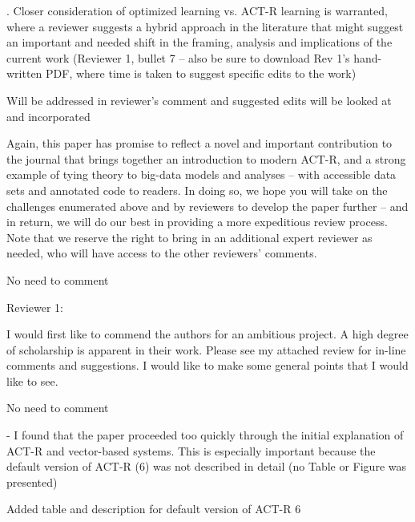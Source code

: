 \documentclass[answers,12pt]{exam}
\begin{document}
\begin{questions}
. Closer consideration of optimized learning vs. ACT-R learning is warranted, where a reviewer suggests a hybrid approach in the literature that might suggest an important and needed shift in the framing, analysis and implications of the current work (Reviewer 1, bullet 7 -- also be sure to download Rev 1's hand-written PDF, where time is taken to suggest specific edits to the work)

\begin{solution}
Will be addressed in reviewer's comment and suggested edits will be looked at and incorporated
\end{solution}

\question Again, this paper has promise to reflect a novel and important contribution to the journal that brings together an introduction to modern ACT-R, and a strong example of tying theory to big-data models and analyses -- with accessible data sets and annotated code to readers. In doing so, we hope you will take on the challenges enumerated above and by reviewers to develop the paper further -- and in return, we will do our best in providing a more expeditious review process. Note that we reserve the right to bring in an additional expert reviewer as needed, who will have access to the other reviewers' comments.

\begin{solution}
No need to comment
\end{solution}



Reviewer 1: 

\question I would first like to commend the authors for an ambitious project. A high degree of scholarship is apparent in their work. Please see my attached review for in-line comments and suggestions. I would like to make some general points that I would like to see.

\begin{solution}
No need to comment
\end{solution}

\question - I found that the paper proceeded too quickly through the initial explanation of ACT-R and vector-based systems. This is especially important because the default version of ACT-R (6) was not described in detail (no Table or Figure was presented)

\begin{solution}
Added table and description for default version of ACT-R 6
\end{solution}


\end{questions}
\end{document}
